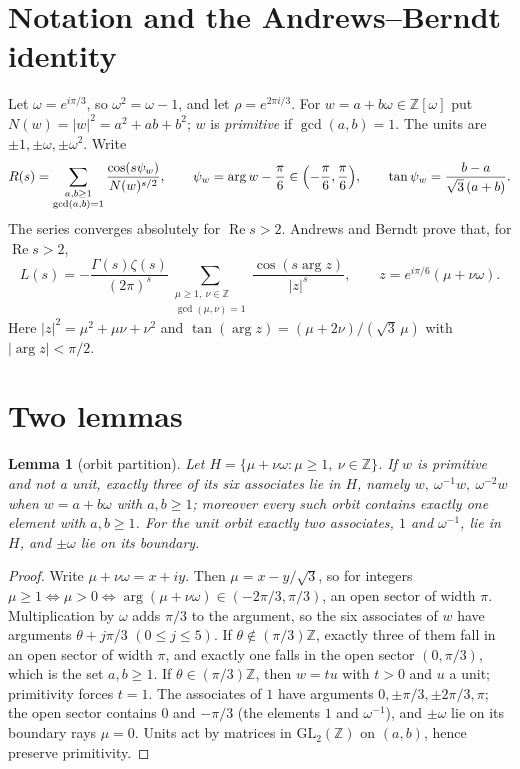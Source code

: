 \documentclass[11pt]{article}
\newtheorem{lemma}{Lemma}
\theoremstyle{remark}
\begin{document}
\section{Notation and the Andrews--Berndt identity}\label{sec:AB}
Let $\omega=e^{i\pi/3}$, so $\omega^2=\omega-1$, and let $\rho=e^{2\pi i/3}$. For $w=a+b\omega\in\mathbb Z[\omega]$ put
$N(w)=|w|^2=a^2+ab+b^2$; $w$ is \emph{primitive} if $\gcd(a,b)=1$. The units are $\pm1,\pm\omega,\pm\omega^2$. Write
\begin{equation}\label{eq:Rdef}
R(s)=\sum_{\substack{a,b\ge1\\ \gcd(a,b)=1}}\frac{\cos(s\psi_w)}{N(w)^{s/2}},\qquad
\psi_w=\arg w-\frac{\pi}{6}\in\Bigl(-\frac{\pi}{6},\frac{\pi}{6}\Bigr),\qquad \tan\psi_w=\frac{b-a}{\sqrt3\,(a+b)}.
\end{equation}
The series converges absolutely for $\operatorname{Re}s>2$. Andrews and Berndt \cite[p.~217]{AB4} prove that, for $\operatorname{Re}s>2$,
\begin{equation}\label{eq:AB}
L(s)=-\frac{\Gamma(s)\zeta(s)}{(2\pi)^s}\sum_{\substack{\mu\ge1,\ \nu\in\mathbb Z\\ \gcd(\mu,\nu)=1}}
\frac{\cos(s\arg z)}{|z|^{s}},\qquad z=e^{i\pi/6}(\mu+\nu\omega).
\end{equation}
Here $|z|^2=\mu^2+\mu\nu+\nu^2$ and $\tan(\arg z)=(\mu+2\nu)/(\sqrt3\,\mu)$ with $|\arg z|<\pi/2$.

\section{Two lemmas}
\begin{lemma}[orbit partition]\label{lem:orbit}
Let $H=\{\mu+\nu\omega:\mu\ge1,\ \nu\in\mathbb Z\}$. If $w$ is primitive and not a unit, exactly three of its six associates lie in $H$,
namely $w,\ \omega^{-1}w,\ \omega^{-2}w$ when $w=a+b\omega$ with $a,b\ge1$; moreover every such orbit contains exactly one element
with $a,b\ge1$. For the unit orbit exactly two associates, $1$ and $\omega^{-1}$, lie in $H$, and $\pm\omega$ lie on its boundary.
\end{lemma}
\begin{proof}
Write $\mu+\nu\omega=x+iy$. Then $\mu=x-y/\sqrt3$, so for integers $\mu\ge1\iff\mu>0\iff\arg(\mu+\nu\omega)\in(-2\pi/3,\pi/3)$,
an open sector of width $\pi$. Multiplication by $\omega$ adds $\pi/3$ to the argument, so the six associates of $w$ have arguments
$\theta+j\pi/3$ $(0\le j\le5)$. If $\theta\notin(\pi/3)\mathbb Z$, exactly three of them fall in an open sector of width $\pi$, and exactly
one falls in the open sector $(0,\pi/3)$, which is the set $a,b\ge1$. If $\theta\in(\pi/3)\mathbb Z$, then $w=tu$ with $t>0$ and $u$
a unit; primitivity forces $t=1$. The associates of $1$ have arguments $0,\pm\pi/3,\pm2\pi/3,\pi$; the open sector contains $0$ and
$-\pi/3$ (the elements $1$ and $\omega^{-1}$), and $\pm\omega$ lie on its boundary rays $\mu=0$. Units act by matrices in
$\mathrm{GL}_2(\mathbb Z)$ on $(a,b)$, hence preserve primitivity.
\end{proof}
\end{document}
